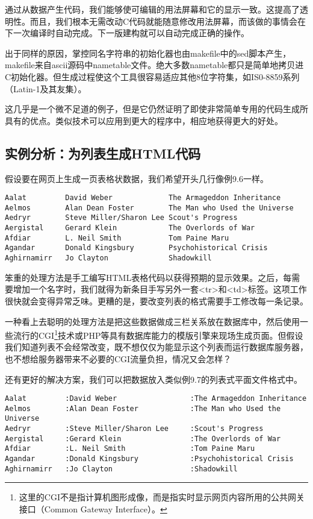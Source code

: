 \documentclass[12pt,oneside]{book}
\begin{document}
\begin{common-format}
通过从数据产生代码，我们能够使可编辑的用法屏幕和它的显示一致。这提高了透明性。而且，我们根本无需改动C代码就能随意修改用法屏幕，而该做的事情会在下一次编译时自动完成。下一版建构就可以自动完成正确的操作。

出于同样的原因，掌控同名字符串的初始化器也由makefile中的sed脚本产生，makefile来自ascii源码中nametable文件。绝大多数nametable都只是简单地拷贝进C初始化器。但生成过程使这个工具很容易适应其他8位字符集，如IS0-8859系列（Latin-1及其友集）。

这几乎是一个微不足道的例子，但是它仍然证明了即使非常简单专用的代码生成所具有的优点。类似技术可以应用到更大的程序中，相应地获得更大的好处。


\subsection{实例分析：为列表生成HTML代码}
假设要在网页上生成一页表格状数据，我们希望开头几行像例9.6一样。

\begin{Verbatim}[label=例9.6 明星列表要求的输出格式]
Aalat         David Weber             The Armageddon Inheritance
Aelmos        Alan Dean Foster        The Man who Used the Universe 
Aedryr        Steve Miller/Sharon Lee Scout's Progress 
Aergistal     Gerard Klein            The Overlords of War 
Afdiar        L. Neil Smith           Tom Paine Maru 
Agandar       Donald Kingsbury        Psychohistorical Crisis 
Aghirnamirr   Jo Clayton              Shadowkill 
\end{Verbatim}

笨重的处理方法是手工编写HTML表格代码以获得预期的显示效果。之后，每需要增加一个名字时，我们就得为新条目手写另外一套<tr>和<td>标签。这项工作很快就会变得异常乏味。更糟的是，要改变列表的格式需要手工修改每一条记录。

一种看上去聪明的处理方法是把这些数据做成三栏关系放在数据库中，然后使用一些流行的CGI\footnote{这里的CGI不是指计算机图形成像，而是指实时显示网页内容所用的公共网关接口（Common Gateway Interface）。}技术或PHP等具有数据库能力的模版引擎来现场生成页面。但假设我们知道列表不会经常改变，既不想仅仅为能显示这个列表而运行数据库服务器，也不想给服务器带来不必要的CGI流量负担，情况又会怎样？

还有更好的解决方案，我们可以把数据放入类似例9.7的列表式平面文件格式中。

\begin{Verbatim}[label=例9.7 明星表的主表]
Aalat         :David Weber                 :The Armageddon Inheritance
Aelmos        :Alan Dean Foster            :The Man who Used the Universe 
Aedryr        :Steve Miller/Sharon Lee     :Scout's Progress 
Aergistal     :Gerard Klein                :The Overlords of War 
Afdiar        :L. Neil Smith               :Tom Paine Maru 
Agandar       :Donald Kingsbury            :Psychohistorical Crisis 
Aghirnamirr   :Jo Clayton                  :Shadowkill 
\end{Verbatim}


\end{common-format}
\end{document}
